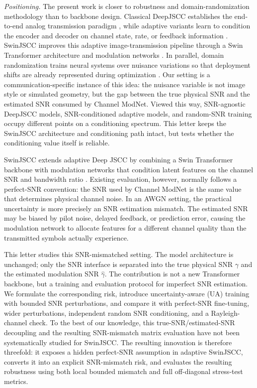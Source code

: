 \documentclass[10pt,journal]{IEEEtran}
\begin{document}
\textit{Positioning.}
The present work is closer to robustness and domain-randomization methodology than to backbone design. Classical DeepJSCC establishes the end-to-end analog transmission paradigm \cite{bourtsoulatze2019deepjscc}, while adaptive variants learn to condition the encoder and decoder on channel state, rate, or feedback information \cite{kurka2020deepjsccf,kurka2021bandwidth,xu2022attention,bian2023deepjscclpp}. SwinJSCC improves this adaptive image-transmission pipeline through a Swin Transformer architecture and modulation networks \cite{liu2021swin,yang2024swinjscc}. In parallel, domain randomization trains neural systems over nuisance variations so that deployment shifts are already represented during optimization \cite{tobin2017domain,volpi2018generalizing}. Our setting is a communication-specific instance of this idea: the nuisance variable is not image style or simulated geometry, but the gap between the true physical SNR and the estimated SNR consumed by Channel ModNet.
Viewed this way, SNR-agnostic DeepJSCC models, SNR-conditioned adaptive models, and random-SNR training occupy different points on a conditioning spectrum. This letter keeps the SwinJSCC architecture and conditioning path intact, but tests whether the conditioning value itself is reliable.

SwinJSCC extends adaptive Deep JSCC by combining a Swin Transformer backbone with modulation networks that condition latent features on the channel SNR and bandwidth ratio \cite{liu2021swin,yang2024swinjscc}. Existing evaluation, however, normally follows a perfect-SNR convention: the SNR used by Channel ModNet is the same value that determines physical channel noise. In an AWGN setting, the practical uncertainty is more precisely an SNR estimation mismatch. The estimated SNR may be biased by pilot noise, delayed feedback, or prediction error, causing the modulation network to allocate features for a different channel quality than the transmitted symbols actually experience.

This letter studies this SNR-mismatched setting. The model architecture is unchanged; only the SNR interface is separated into the true physical SNR $\gamma$ and the estimated modulation SNR $\hat{\gamma}$. The contribution is not a new Transformer backbone, but a training and evaluation protocol for imperfect SNR estimation. We formulate the corresponding risk, introduce uncertainty-aware (UA) training with bounded SNR perturbations, and compare it with perfect-SNR fine-tuning, wider perturbations, independent random SNR conditioning, and a Rayleigh-channel check.
To the best of our knowledge, this true-SNR/estimated-SNR decoupling and the resulting SNR-mismatch matrix evaluation have not been systematically studied for SwinJSCC. The resulting innovation is therefore threefold: it exposes a hidden perfect-SNR assumption in adaptive SwinJSCC, converts it into an explicit SNR-mismatch risk, and evaluates the resulting robustness using both local bounded mismatch and full off-diagonal stress-test metrics.
\end{document}
